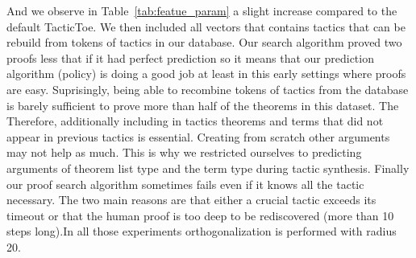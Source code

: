 \documentclass[runningheads,a4paper,draft]{svjour3}
\def\metis{\textsf{Metis}\xspace}
\def\tactictoe{\textsf{TacticToe}\xspace}
\newcommand{\ra}[1]{\renewcommand{\arraystretch}{#1}}
\begin{document}
And we observe in Table~\ref{tab:featue_param} a 
slight increase compared to the default \tactictoe. We then included all 
vectors that contains tactics that can be rebuild from tokens of
tactics in our database. 
Our search algorithm proved two proofs less that if it had perfect prediction 
so it means that our prediction algorithm (policy) is doing a good  job at 
least in this early settings where proofs are easy. 
Suprisingly, being able to recombine tokens of tactics from the database is 
barely sufficient to prove more than half of the theorems in this dataset. The 
Therefore, additionally including in tactics theorems and terms that did not 
appear in previous tactics is essential. Creating from scratch other arguments 
may not help as much. This is why we restricted ourselves to predicting 
arguments of theorem list type and the term type during tactic synthesis. 
Finally our proof search algorithm sometimes fails even if it knows all the 
tactic necessary. The two main reasons are that either a crucial tactic 
exceeds its timeout or that the human proof is too deep to be rediscovered 
(more than 10 steps long).In all those experiments orthogonalization is 
performed with 
radius 20.
%
%
\end{document}
